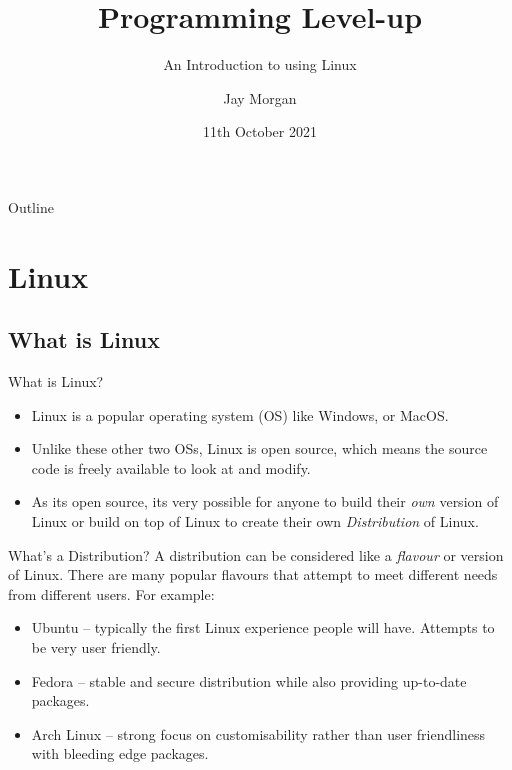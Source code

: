 \documentclass[10pt]{beamer}
\author{Jay Morgan}
\date{11th October 2021}
\title{Programming Level-up}
\subtitle{An Introduction to using Linux}
\begin{document}
\maketitle
\begin{frame}{Outline}
\tableofcontents
\end{frame}


\section{Linux}
\label{sec:org2adc12d}

\subsection{What is Linux}
\label{sec:org84823dc}

\begin{frame}[label={sec:org0100c76}]{What is Linux?}
\begin{itemize}
\item Linux is a popular operating system (OS) like Windows, or MacOS.
\item Unlike these other two OSs, Linux is open source, which means the source code
is freely available to look at and modify.
\item As its open source, its very possible for anyone to build their \emph{own} version of
Linux or build on top of Linux to create their own \emph{Distribution} of Linux.
\end{itemize}
\end{frame}

\begin{frame}[label={sec:orgfbd376d}]{What's a Distribution?}
A distribution can be considered like a \emph{flavour} or version of Linux. There are
many popular flavours that attempt to meet different needs from different
users. For example:

\begin{itemize}
\item Ubuntu -- typically the first Linux experience people will have. Attempts to be
very user friendly.
\item Fedora -- stable and secure distribution while also providing up-to-date packages.
\item Arch Linux -- strong focus on customisability rather than user friendliness
with bleeding edge packages.
\end{itemize}
\end{frame}
\end{document}
